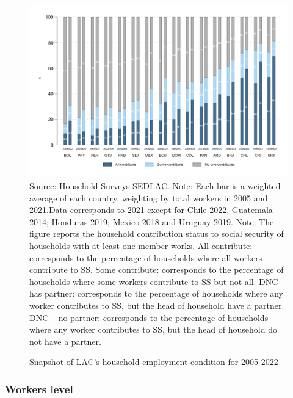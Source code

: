 \documentclass[english]{article}
\begin{document}
\begin{itemize}
\begin{landscape}
\begin{figure}[!htb]
    \centering
    \caption{Snapshot of LAC’s household employment condition for 2005-2022}     
    \includegraphics[scale=.45]{latex/figures/Household/snapshot_household_2005-2022.png}
    \label{fig:Household20052021}
    \justifying
    \footnotesize{Source: Household Surveys-SEDLAC.}
    \footnotesize{Note: Each bar is a weighted average of each country, weighting by total workers in 2005 and 2021.Data corresponds to 2021 except for Chile 2022, Guatemala 2014; Honduras 2019; Mexico 2018 and Uruguay 2019.}
    \footnotesize{Note: The figure reports the household contribution status to social security of households with at least one member works.   All contribute: corresponds to the percentage of households where all workers contribute to SS. Some contribute: corresponds to the percentage of households where some workers contribute to SS but not all. DNC – has partner: corresponds to the percentage of households where any worker contributes to SS, but the head of household have a partner. DNC – no partner: corresponds to the percentage of households where any worker contributes to SS, but the head of household do not have a partner.}
\end{figure}
\end{landscape}

\subsubsection{Workers level} 


\end{itemize}
\end{document}
